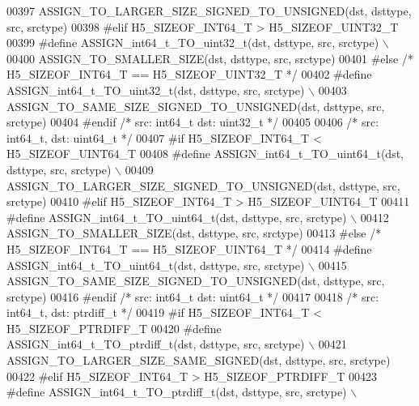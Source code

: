 \begin{DoxyCode}
00397 \textcolor{preprocessor}{        ASSIGN\_TO\_LARGER\_SIZE\_SIGNED\_TO\_UNSIGNED(dst, dsttype, src, srctype)}
00398 \textcolor{preprocessor}{#elif H5\_SIZEOF\_INT64\_T > H5\_SIZEOF\_UINT32\_T}
00399 \textcolor{preprocessor}{    #define ASSIGN\_int64\_t\_TO\_uint32\_t(dst, dsttype, src, srctype) \(\backslash\)}
00400 \textcolor{preprocessor}{        ASSIGN\_TO\_SMALLER\_SIZE(dst, dsttype, src, srctype)}
00401 \textcolor{preprocessor}{#else }\textcolor{comment}{/* H5\_SIZEOF\_INT64\_T == H5\_SIZEOF\_UINT32\_T */}\textcolor{preprocessor}{}
00402 \textcolor{preprocessor}{    #define ASSIGN\_int64\_t\_TO\_uint32\_t(dst, dsttype, src, srctype) \(\backslash\)}
00403 \textcolor{preprocessor}{        ASSIGN\_TO\_SAME\_SIZE\_SIGNED\_TO\_UNSIGNED(dst, dsttype, src, srctype)}
00404 \textcolor{preprocessor}{#endif }\textcolor{comment}{/* src: int64\_t dst: uint32\_t */}\textcolor{preprocessor}{}
00405 
00406 \textcolor{comment}{/* src: int64\_t, dst: uint64\_t */}
00407 \textcolor{preprocessor}{#if H5\_SIZEOF\_INT64\_T < H5\_SIZEOF\_UINT64\_T}
00408 \textcolor{preprocessor}{    #define ASSIGN\_int64\_t\_TO\_uint64\_t(dst, dsttype, src, srctype) \(\backslash\)}
00409 \textcolor{preprocessor}{        ASSIGN\_TO\_LARGER\_SIZE\_SIGNED\_TO\_UNSIGNED(dst, dsttype, src, srctype)}
00410 \textcolor{preprocessor}{#elif H5\_SIZEOF\_INT64\_T > H5\_SIZEOF\_UINT64\_T}
00411 \textcolor{preprocessor}{    #define ASSIGN\_int64\_t\_TO\_uint64\_t(dst, dsttype, src, srctype) \(\backslash\)}
00412 \textcolor{preprocessor}{        ASSIGN\_TO\_SMALLER\_SIZE(dst, dsttype, src, srctype)}
00413 \textcolor{preprocessor}{#else }\textcolor{comment}{/* H5\_SIZEOF\_INT64\_T == H5\_SIZEOF\_UINT64\_T */}\textcolor{preprocessor}{}
00414 \textcolor{preprocessor}{    #define ASSIGN\_int64\_t\_TO\_uint64\_t(dst, dsttype, src, srctype) \(\backslash\)}
00415 \textcolor{preprocessor}{        ASSIGN\_TO\_SAME\_SIZE\_SIGNED\_TO\_UNSIGNED(dst, dsttype, src, srctype)}
00416 \textcolor{preprocessor}{#endif }\textcolor{comment}{/* src: int64\_t dst: uint64\_t */}\textcolor{preprocessor}{}
00417 
00418 \textcolor{comment}{/* src: int64\_t, dst: ptrdiff\_t */}
00419 \textcolor{preprocessor}{#if H5\_SIZEOF\_INT64\_T < H5\_SIZEOF\_PTRDIFF\_T}
00420 \textcolor{preprocessor}{    #define ASSIGN\_int64\_t\_TO\_ptrdiff\_t(dst, dsttype, src, srctype) \(\backslash\)}
00421 \textcolor{preprocessor}{        ASSIGN\_TO\_LARGER\_SIZE\_SAME\_SIGNED(dst, dsttype, src, srctype)}
00422 \textcolor{preprocessor}{#elif H5\_SIZEOF\_INT64\_T > H5\_SIZEOF\_PTRDIFF\_T}
00423 \textcolor{preprocessor}{    #define ASSIGN\_int64\_t\_TO\_ptrdiff\_t(dst, dsttype, src, srctype) \(\backslash\)}

\end{DoxyCode}
